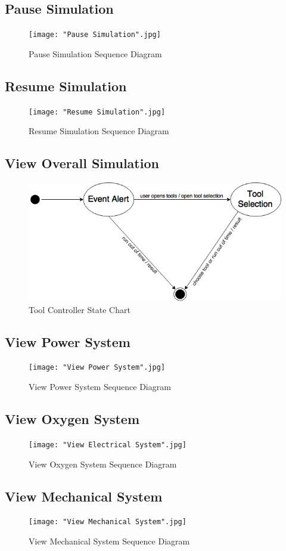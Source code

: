 \documentclass[12pt, titlepage]{article}
\begin{document}
\subsection*{Pause Simulation}
\begin{figure}[H]
\centering
\texttt{[image: "Pause Simulation".jpg]}
\caption{Pause Simulation Sequence Diagram}
\end{figure}
\subsection*{Resume Simulation}
\begin{figure}[H]
\centering
\texttt{[image: "Resume Simulation".jpg]}
\caption{Resume Simulation Sequence Diagram}
\end{figure}
\subsection*{View Overall Simulation}
\begin{figure}[H]
\centering
\includegraphics[width=120mm]{ToolController.png}
\caption{Tool Controller State Chart}
\end{figure}
\subsection*{View Power System}
\begin{figure}[H]
\centering
\texttt{[image: "View Power System".jpg]}
\caption{View Power System Sequence Diagram}
\end{figure}
\subsection*{View Oxygen System}
\begin{figure}[H]
\centering
\texttt{[image: "View Electrical System".jpg]}
\caption{View Oxygen System Sequence Diagram}
\end{figure}
\subsection*{View Mechanical System}
\begin{figure}[H]
\centering
\texttt{[image: "View Mechanical System".jpg]}
\caption{View Mechanical System Sequence Diagram}
\end{figure}
\end{document}
